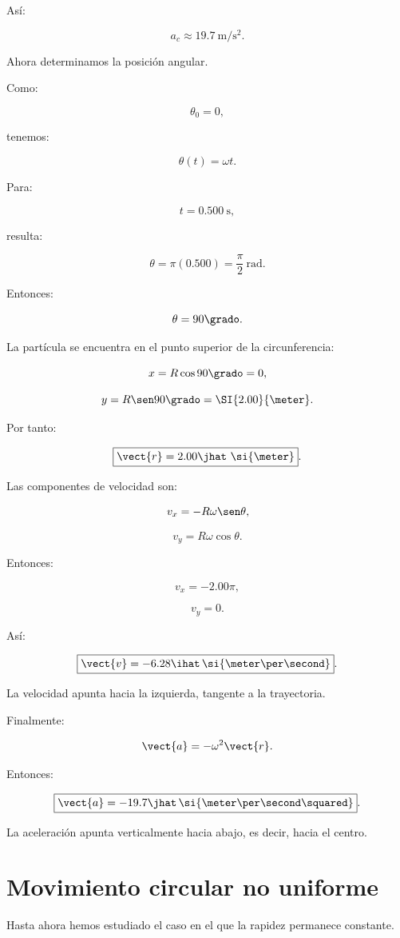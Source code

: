 Así:

\[
\boxed{
a_c\approx
\SI{19.7}{\meter\per\second\squared}
}.
\]

Ahora determinamos la posición angular.

Como:

\[
\theta_0=0,
\]

tenemos:

\[
\theta(t)=\omega t.
\]

Para:

\[
t=\SI{0.500}{\second},
\]

resulta:

\[
\theta
=
\pi(0.500)
=
\frac{\pi}{2}\ \si{\radian}.
\]

Entonces:

\[
\theta=90\grado.
\]

La partícula se encuentra en el punto superior de la circunferencia:

\[
x=R\cos90\grado=0,
\]

\[
y=R\sen90\grado=\SI{2.00}{\meter}.
\]

Por tanto:

\[
\boxed{
\vect{r}
=
2.00\jhat\ \si{\meter}
}.
\]

Las componentes de velocidad son:

\[
v_x=-R\omega\sen\theta,
\]

\[
v_y=R\omega\cos\theta.
\]

Entonces:

\[
v_x
=
-2.00\pi,
\]

\[
v_y=0.
\]

Así:

\[
\boxed{
\vect{v}
=
-6.28\ihat\,
\si{\meter\per\second}
}.
\]

La velocidad apunta hacia la izquierda, tangente a la trayectoria.

Finalmente:

\[
\vect{a}
=
-\omega^2\vect{r}.
\]

Entonces:

\[
\boxed{
\vect{a}
=
-19.7\jhat\,
\si{\meter\per\second\squared}
}.
\]

La aceleración apunta verticalmente hacia abajo, es decir, hacia el centro.


\section{Movimiento circular no uniforme}

Hasta ahora hemos estudiado el caso en el que la rapidez permanece constante.

